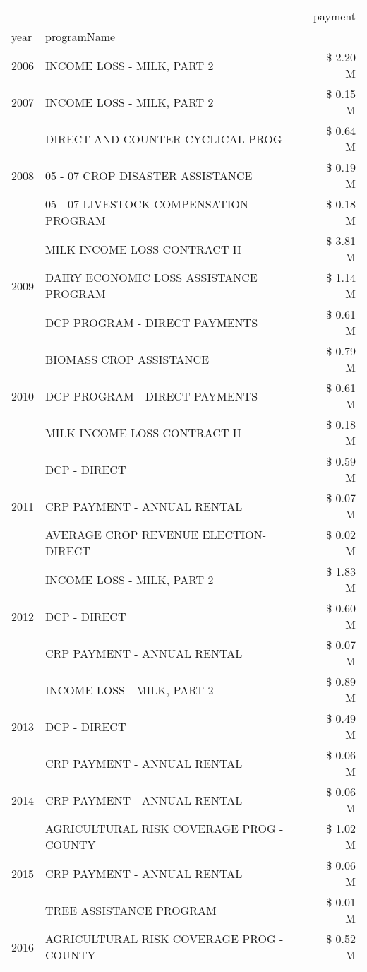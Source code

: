 \begin{tabular}{llr}
\toprule
 &  & payment \\
year & programName &  \\
\midrule
2006 & INCOME LOSS - MILK, PART 2 & \$ 2.20 M \\
\cline{1-3}
2007 & INCOME LOSS - MILK, PART 2 & \$ 0.15 M \\
\cline{1-3}
\multirow[t]{3}{*}{2008} & DIRECT AND COUNTER CYCLICAL PROG & \$ 0.64 M \\
 & 05 - 07 CROP DISASTER ASSISTANCE & \$ 0.19 M \\
 & 05 - 07 LIVESTOCK COMPENSATION PROGRAM & \$ 0.18 M \\
\cline{1-3}
\multirow[t]{3}{*}{2009} & MILK INCOME LOSS CONTRACT II & \$ 3.81 M \\
 & DAIRY ECONOMIC LOSS ASSISTANCE PROGRAM & \$ 1.14 M \\
 & DCP PROGRAM - DIRECT PAYMENTS & \$ 0.61 M \\
\cline{1-3}
\multirow[t]{3}{*}{2010} & BIOMASS CROP ASSISTANCE & \$ 0.79 M \\
 & DCP PROGRAM - DIRECT PAYMENTS & \$ 0.61 M \\
 & MILK INCOME LOSS CONTRACT II & \$ 0.18 M \\
\cline{1-3}
\multirow[t]{3}{*}{2011} & DCP - DIRECT & \$ 0.59 M \\
 & CRP PAYMENT - ANNUAL RENTAL & \$ 0.07 M \\
 & AVERAGE CROP REVENUE ELECTION-DIRECT & \$ 0.02 M \\
\cline{1-3}
\multirow[t]{3}{*}{2012} & INCOME LOSS - MILK, PART 2 & \$ 1.83 M \\
 & DCP - DIRECT & \$ 0.60 M \\
 & CRP PAYMENT - ANNUAL RENTAL & \$ 0.07 M \\
\cline{1-3}
\multirow[t]{3}{*}{2013} & INCOME LOSS - MILK, PART 2 & \$ 0.89 M \\
 & DCP - DIRECT & \$ 0.49 M \\
 & CRP PAYMENT - ANNUAL RENTAL & \$ 0.06 M \\
\cline{1-3}
2014 & CRP PAYMENT - ANNUAL RENTAL & \$ 0.06 M \\
\cline{1-3}
\multirow[t]{3}{*}{2015} & AGRICULTURAL RISK COVERAGE PROG - COUNTY & \$ 1.02 M \\
 & CRP PAYMENT - ANNUAL RENTAL & \$ 0.06 M \\
 & TREE ASSISTANCE PROGRAM & \$ 0.01 M \\
\cline{1-3}
\multirow[t]{3}{*}{2016} & AGRICULTURAL RISK COVERAGE PROG - COUNTY & \$ 0.52 M \\

\end{tabular}
